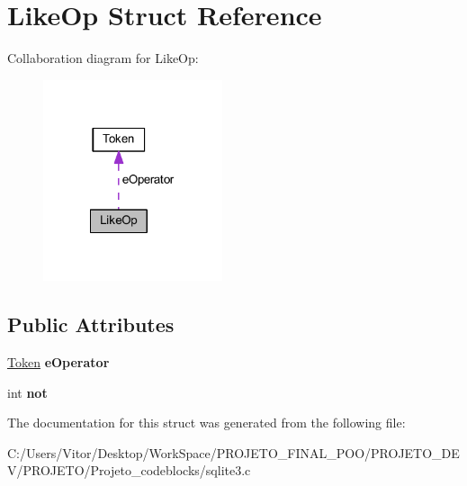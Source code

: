 \hypertarget{struct_like_op}{\section{Like\-Op Struct Reference}
\label{struct_like_op}
}


Collaboration diagram for Like\-Op\-:\nopagebreak
\begin{figure}[H]
\begin{center}
\leavevmode
\includegraphics[width=149pt]{struct_like_op__coll__graph}
\end{center}
\end{figure}
\subsection*{Public Attributes}
\begin{DoxyCompactItemize}
\item 
\hypertarget{struct_like_op_a02dccb0eea9610285333434a755acae8}{\hyperlink{struct_token}{Token} {\bfseries e\-Operator}}\label{struct_like_op_a02dccb0eea9610285333434a755acae8}

\item 
\hypertarget{struct_like_op_a876c098f6889c662bd4616e83b09ff0d}{int {\bfseries not}}\label{struct_like_op_a876c098f6889c662bd4616e83b09ff0d}

\end{DoxyCompactItemize}


The documentation for this struct was generated from the following file\-:\begin{DoxyCompactItemize}
\item 
C\-:/\-Users/\-Vitor/\-Desktop/\-Work\-Space/\-P\-R\-O\-J\-E\-T\-O\-\_\-\-F\-I\-N\-A\-L\-\_\-\-P\-O\-O/\-P\-R\-O\-J\-E\-T\-O\-\_\-\-D\-E\-V/\-P\-R\-O\-J\-E\-T\-O/\-Projeto\-\_\-codeblocks/sqlite3.\-c\end{DoxyCompactItemize}
